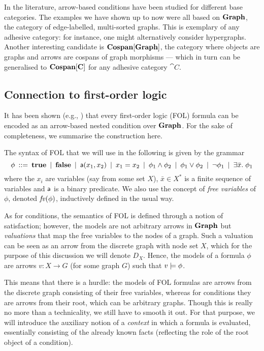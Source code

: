 In the literature, arrow-based conditions have been studied for different base categories. The examples we have shown up to now were all based on $\textbf{Graph}$, the category of edge-labelled, multi-sorted graphs. This is exemplary of any adhesive category: for instance, one might alternatively consider hypergraphs. Another interesting candidate is $\textbf{Cospan}[\textbf{Graph}]$, the category where objects are graphs and arrows are cospans of graph morphisms --- which in turn can be generalised to $\textbf{Cospan}[\textbf{C}]$ for any adhesive category $\cat C$.

\subsection{Connection to first-order logic}

It has been shown (e.g., \cite{Rensink-FOL,Habel-FOL}) that every first-order logic (FOL) formula can be encoded as an arrow-based nested condition over $\textbf{Graph}$. For the sake of completeness, we summarise the construction here.

The syntax of FOL that we will use in the following is given by the grammar
%
\[ \phi \:::=\: \textbf{true}
        \:\mid\: \textbf{false}
		\:\mid\: \mathsf{a}(x_1,x_2)
        \:\mid\: x_1=x_2
		\:\mid\: \phi_1\wedge \phi_2
		\:\mid\: \phi_1\vee \phi_2
		\:\mid\: \neg\phi_1
		\:\mid\: \exists \bar x.\; \phi_1 
		\]
where the $x_i$ are variables (say from some set $X$), $\bar x\in X^*$ is a finite sequence of variables and $\mathsf{a}$ is a binary predicate. We also use the concept of \emph{free variables} of $\phi$, denoted $\mathit{fv}(\phi)$, inductively defined in the usual way.

As for conditions, the semantics of FOL is defined through a notion of satisfaction; however, the models are not arbitrary arrows in $\textbf{Graph}$ but \emph{valuations} that map the free variables to the nodes of a graph. Such a valuation can be seen as an arrow from the discrete graph with node set $X$, which for the purpose of this discussion we will denote $D_X$. Hence, the models of a formula $\phi$ are arrows $v:X\to G$ (for some graph $G$) such that $v\models\phi$.

This means that there is a hurdle: the models of FOL formulas are arrows from the discrete graph consisting of their free variables, whereas for conditions they are arrows from their root, which can be arbitrary graphs. Though this is really no more than a technicality, we still have to smooth it out. For that purpose, we will introduce the auxiliary notion of a \emph{context} in which a formula is evaluated, essentially consisting of the already known facts (reflecting the role of the root object of a condition).

